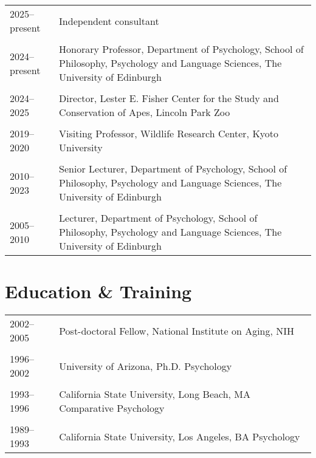 \documentclass[11pt]{article}
\begin{document}
\begin{tabular}{p{3cm}p{12cm}}

2025--present & Independent consultant \\ \\ 
  
2024--present & Honorary Professor, Department of Psychology, School
                of Philosophy, Psychology and Language Sciences, The
                University of Edinburgh \\ \\ 
  
2024--2025 & Director, Lester E. Fisher Center for the Study and
                Conservation of Apes, Lincoln Park Zoo \\ \\

2019--2020 & Visiting Professor, Wildlife Research Center, Kyoto
             University \\ \\ 

2010--2023 & Senior Lecturer, Department of Psychology, School of
             Philosophy, Psychology and Language Sciences, The
             University of Edinburgh \\ \\

2005--2010 & Lecturer, Department of Psychology, School of Philosophy,
             Psychology and Language Sciences, The University of
             Edinburgh 

\end{tabular}

\section*{Education \& Training}

\begin{tabular}{p{3cm}p{12cm}}
2002--2005 & Post-doctoral Fellow, National Institute on Aging, NIH
\\ \\

1996--2002 & University of Arizona, Ph.D. Psychology
\\ \\

1993--1996 & California State University, Long Beach, MA Comparative
Psychology \\ \\

1989--1993 & California State University, Los Angeles, BA Psychology
\end{tabular}
\end{document}
